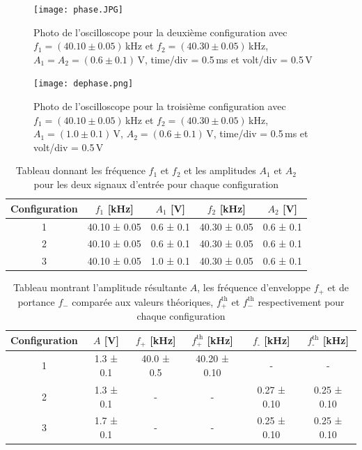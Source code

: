 \documentclass[a4paper, 12pt,oneside]{article}
\begin{document}
\begin{figure}[H]
    \centering
    \begin{minipage}{0.45\textwidth}
        \centering
        \texttt{[image: phase.JPG]}
        \captionsetup{justification=centering}
        \caption{Photo de l'oscilloscope pour la deuxième configuration avec $f_1=(40.10\pm0.05)$\,kHz et $f_2=(40.30\pm0.05)$\,kHz, $A_1=A_2=(0.6\pm0.1)$\,V, time/div = 0.5\,ms et volt/div = 0.5\,V}
        \label{fig5}
    \end{minipage}
    \hfill
    \begin{minipage}{0.45\textwidth}
        \centering
        \texttt{[image: dephase.png]}
        \captionsetup{justification=centering}
        \caption{Photo de l'oscilloscope pour la troisième configuration avec $f_1=(40.10\pm0.05)$\,kHz et $f_2=(40.30\pm0.05)$\,kHz, $A_1=(1.0\pm0.1)$\,V, $A_2=(0.6\pm0.1)$\,V, time/div = 0.5\,ms et volt/div = 0.5\,V}
        \label{fig6}
    \end{minipage}
\end{figure}

\vspace{-0.2cm}

\begin{table}[H]
    \centering
    \begin{tabular}{|c||c|c|c|c|}
        \hline
        Configuration & $f_1$ [kHz] & $A_1$ [V] & $f_2$ [kHz] & $A_2$ [V]\\
        \hline
        1 & 40.10 ± 0.05& 0.6 ± 0.1& 40.30 ± 0.05& 0.6 ± 0.1\\
        \hline
        2 & 40.10 ± 0.05& 0.6 ± 0.1& 40.30 ± 0.05& 0.6 ± 0.1\\
        \hline
        3& 40.10 ± 0.05& 1.0 ± 0.1& 40.30 ± 0.05& 0.6 ± 0.1\\
        \hline
    \end{tabular}
    \captionsetup{justification=centering}
    \caption{Tableau donnant les fréquence $f_1$ et $f_2$ et les amplitudes $A_1$ et $A_2$ pour les deux signaux d'entrée pour chaque configuration}
    \label{tab1}
\end{table}


\begin{table}[H]
    \centering
    \begin{tabular}{|c||c|c|c|c|c|}
        \hline
        Configuration & $A$ [V] & $f_{\text{+}}$ [kHz] & $f_{\text{+}}^{\text{th}}$ [kHz] & $f_{\text{-}}$ [kHz] & $f_{\text{-}}^{\text{th}}$ [kHz]\\
        \hline
        1 & 1.3 ± 0.1& 40.0 ± 0.5& 40.20 ± 0.10& -& -\\
        \hline
        2 & 1.3 ± 0.1& -& -& 0.27 ± 0.10& 0.25 ± 0.10\\
        \hline
        3 & 1.7 ± 0.1& -& -& 0.25 ± 0.10& 0.25 ± 0.10\\
        \hline
    \end{tabular}
    \captionsetup{justification=centering}
    \caption{Tableau montrant l'amplitude résultante $A$, les fréquence d'enveloppe $f_+$ et de portance $f_-$ comparée aux valeurs théoriques, $f_+^{\text{th}}$ et $f_-^{\text{th}}$ respectivement pour chaque configuration}
    \label{tab2}
\end{table}
\end{document}

